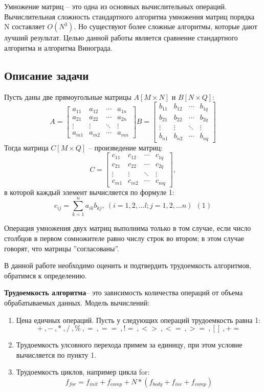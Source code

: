 \documentclass[a4paper,14pt]{article} %
\begin{document}
        Умножение матриц – это одна из основных вычислительных операций. Вычислительная сложность стандартного алгоритма умножения матриц порядка N составляет $O(N^3)$. Но существуют более сложные алгоритмы, которые дают лучший результат. Целью данной работы является сравнение стандартного алгоритма и алгоритма Винограда. 
        
        
        \subsection{Описание задачи}
        \hfill
        
	Пусть даны две прямоугольные матрицы $A[M \times N]$ и $B[N \times Q]$:
	$$
	A = 
  	\begin{bmatrix} 
   		a_{11} & a_{12} & \cdots & a_{1n} \\
    		a_{21} & a_{22} & \cdots & a_{2n} \\ 
   		\vdots & \vdots & \ddots & \vdots \\ 
		a_{m1} & a_{m2} & \cdots & a_{mn}
	\end{bmatrix}
	B =   
	\begin{bmatrix} 
		b_{11} & b_{12} & \cdots & b_{1q} \\
		b_{21} & b_{22} & \cdots & b_{2q} \\ 
		\vdots & \vdots & \ddots & \vdots \\ 
    		b_{n1} & b_{n2} & \cdots & b_{nq}
  	\end{bmatrix}
	$$
	Тогда матрица $C[M \times Q]$ -- произведение матриц:
	$$
	C = 
	\begin{bmatrix} 
    		c_{11} & c_{12} & \cdots & c_{1q} \\
   		c_{21} & c_{22} & \cdots & c_{2q} \\ 
   		\vdots & \vdots & \ddots & \vdots \\ 
    		c_{m1} & c_{m2} & \cdots & c_{mq}
  	\end{bmatrix},
	$$
	в которой каждый элемент вычисляется по формуле 1: 
	$$c_{ij} = \sum_{k=1}^n a_{ik}b_{kj}, ~(i=1, 2, \ldots l;j=1, 2, \ldots n)~~(1)$$
	
	Операция умножения двух матриц выполнима только в том случае, если число столбцов в первом сомножителе равно числу строк во втором; в этом случае говорят, что матрицы ''согласованы''.
        
        В данной работе необходимо оценить и подтвердить трудоемкость алгоритмов, обратимся к определению. 
        
        \textbf{Трудоемкость алгоритма}-- это зависимость количества операций от объема обрабатываемых данных.
        Модель вычислений:
        \begin{enumerate}
		\item Цена едичных операций. Пусть у следующих операций трудоемкость равна 1:
		$$+~,-~,*~,/~,\%~,=~,==~,!=~,<>~,<=~,>=~,[]~,+=$$
		\item Трудоемкость улсовного перехода примем за единицу, при этом условие вычисляется по пункту 1. 
		\item Трудоемкость циклов, например цикла for:
		$$f_{for} = f_{init}+f_{comp}+N*(f_{body}+f_{inc}+f_{comp})$$
	\end{enumerate}
\end{document}
